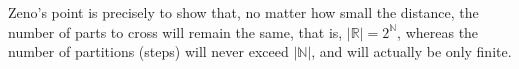 \documentclass[preview]{standalone}
\begin{document}
\begin{center}
Zeno's point is precisely to show that, no matter how small the distance, the number of parts to cross will remain the same, that is, $ |\mathbb{R}| = 2^ \mathbb{N}$, whereas the number of partitions (steps) will never exceed $|\mathbb{N}|$, and will actually be only finite.
\end{center}
\end{document}
